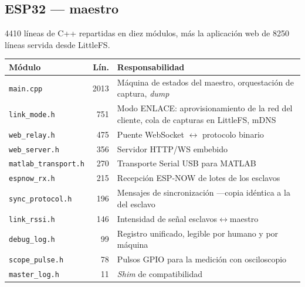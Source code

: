 \subsection{ESP32 --- maestro}

\num{4410} l\'ineas de C++ repartidas en diez m\'odulos, m\'as la aplicaci\'on web
de \num{8250} l\'ineas servida desde LittleFS.

\begin{center}\footnotesize
\begin{tabularx}{\textwidth}{@{}l r X@{}}
\toprule
M\'odulo & L\'in. & Responsabilidad \\
\midrule
\texttt{main.cpp} & 2013 & M\'aquina de estados del maestro, orquestaci\'on de captura, \emph{dump} \\
\texttt{link\_mode.h} & 751 & Modo ENLACE: aprovisionamiento de la red del cliente, cola de capturas en LittleFS, mDNS \\
\texttt{web\_relay.h} & 475 & Puente WebSocket $\leftrightarrow$ protocolo binario \\
\texttt{web\_server.h} & 356 & Servidor HTTP/WS embebido \\
\texttt{matlab\_transport.h} & 270 & Transporte Serial USB para MATLAB \\
\texttt{espnow\_rx.h} & 215 & Recepci\'on ESP-NOW de lotes de los esclavos \\
\texttt{sync\_protocol.h} & 196 & Mensajes de sincronizaci\'on ---copia id\'entica a la del esclavo \\
\texttt{link\_rssi.h} & 146 & Intensidad de se\~nal esclavos$\leftrightarrow$maestro \\
\texttt{debug\_log.h} & 99 & Registro unificado, legible por humano y por m\'aquina \\
\texttt{scope\_pulse.h} & 78 & Pulsos GPIO para la medici\'on con osciloscopio \\
\texttt{master\_log.h} & 11 & \emph{Shim} de compatibilidad \\
\bottomrule
\end{tabularx}
\end{center}


